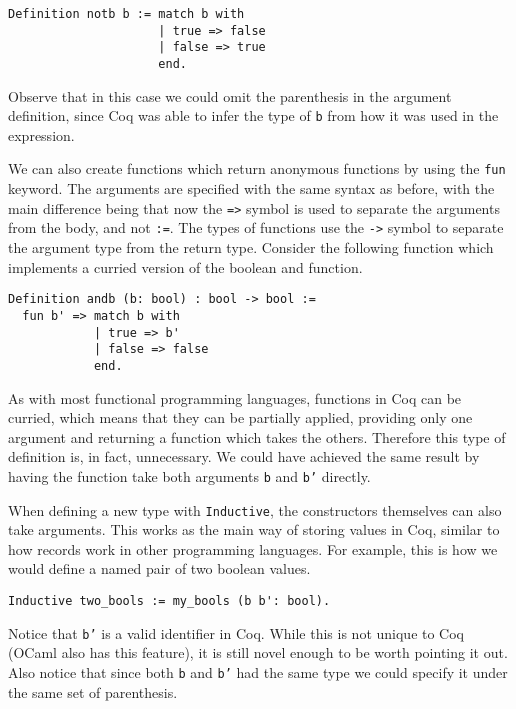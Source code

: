 \begin{verbatim}
Definition notb b := match b with 
                     | true => false
                     | false => true
                     end.
\end{verbatim}

Observe that in this case we could omit the parenthesis in the argument definition, since Coq was
able to infer the type of \texttt{b} from how it was used in the expression.

We can also create functions which return anonymous functions by using the \texttt{fun} 
keyword. The arguments are specified with the same syntax as before, with the main difference being 
that now the \texttt{=>} symbol is used to separate the arguments from the body, and not 
\texttt{:=}. The types of functions use the \texttt{->} symbol to separate the 
argument type from the return type. Consider the following function which implements a curried
version of the boolean and function.

\begin{verbatim}
Definition andb (b: bool) : bool -> bool :=
  fun b' => match b with 
            | true => b'
            | false => false
            end.
\end{verbatim}
\noindent As with most functional programming languages, functions in Coq can be curried, which means 
that they can be partially applied, providing only one argument and returning a function which takes 
the others. Therefore this type of definition is, in fact, unnecessary. We could have achieved the 
same result by having the function take both arguments \texttt{b} and \texttt{b'} 
directly.

When defining a new type with \texttt{Inductive}, the constructors themselves can also take 
arguments. This works as the main way of storing values in Coq, similar to how records work in other
programming languages. For example, this is how we would define a named pair of two boolean values.

\begin{verbatim}
Inductive two_bools := my_bools (b b': bool).
\end{verbatim}

Notice that \texttt{b'} is a valid identifier in Coq. While this is not unique to Coq (OCaml 
also has this feature), it is still novel enough to be worth pointing it out. Also notice that since 
both \texttt{b} and  \texttt{b'} had the same type we could specify it under the 
same set of parenthesis.

